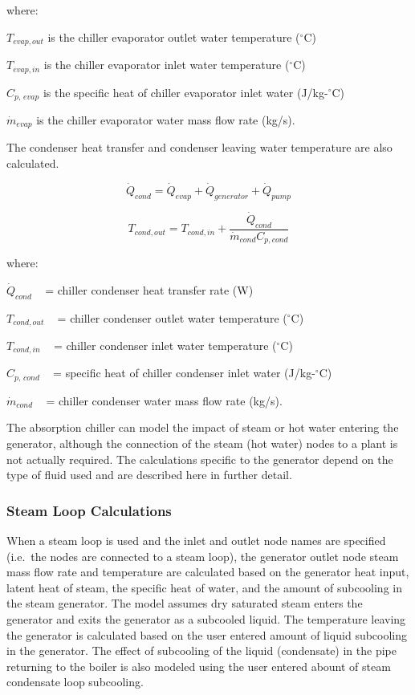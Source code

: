 where:

\({T_{evap,out}}\) is the chiller evaporator outlet water temperature (\(^{\circ}\)C)

\({T_{evap,in}}\) is the chiller evaporator inlet water temperature (\(^{\circ}\)C)

\({C_{p,\,evap}}\) is the specific heat of chiller evaporator inlet water (J/kg-\(^{\circ}\)C)

\({\dot m_{evap}}\) is the chiller evaporator water mass flow rate (kg/s).

The condenser heat transfer and condenser leaving water temperature are also calculated.

\begin{equation}
{\dot Q_{cond}} = {\dot Q_{evap}} + {\dot Q_{generator}} + {\dot Q_{pump}}
\end{equation}

\begin{equation}
  T_{cond,out} = T_{cond,in} + \frac{\dot{Q}_{cond}}{\dot{m}_{cond}C_{p,cond}}
\end{equation}

where:

\({\dot Q_{cond}}\) ~ = chiller condenser heat transfer rate (W)

\({T_{cond,out}}\) ~ = chiller condenser outlet water temperature (\(^{\circ}\)C)

\({T_{cond,in}}\) ~ = chiller condenser inlet water temperature (\(^{\circ}\)C)

\({C_{p,\,cond}}\) ~ = specific heat of chiller condenser inlet water (J/kg-\(^{\circ}\)C)

\({\dot m_{cond}}\) ~ = chiller condenser water mass flow rate (kg/s).

The absorption chiller can model the impact of steam or hot water entering the generator, although the connection of the steam (hot water) nodes to a plant is not actually required. The calculations specific to the generator depend on the type of fluid used and are described here in further detail.

\subsubsection{Steam Loop Calculations}\label{steam-loop-calculations-1}

When a steam loop is used and the inlet and outlet node names are specified (i.e.~the nodes are connected to a steam loop), the generator outlet node steam mass flow rate and temperature are calculated based on the generator heat input, latent heat of steam, the specific heat of water, and the amount of subcooling in the steam generator. The model assumes dry saturated steam enters the generator and exits the generator as a subcooled liquid. The temperature leaving the generator is calculated based on the user entered amount of liquid subcooling in the generator. The effect of subcooling of the liquid (condensate) in the pipe returning to the boiler is also modeled using the user entered abount of steam condensate loop subcooling.

